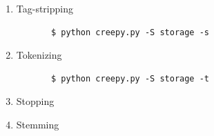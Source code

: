\documentclass[letterpaper,11pt,twoside]{article}
\begin{document}
\begin{enumerate}
	
	\item Tag-stripping
	\begin{verbatim} 
	   $ python creepy.py -S storage -s 
	\end{verbatim}
	
	\item Tokenizing
	\begin{verbatim} 
	   $ python creepy.py -S storage -t 
	\end{verbatim}
	
	\item Stopping
	
	\item Stemming
	
\end{enumerate}
\end{document}
